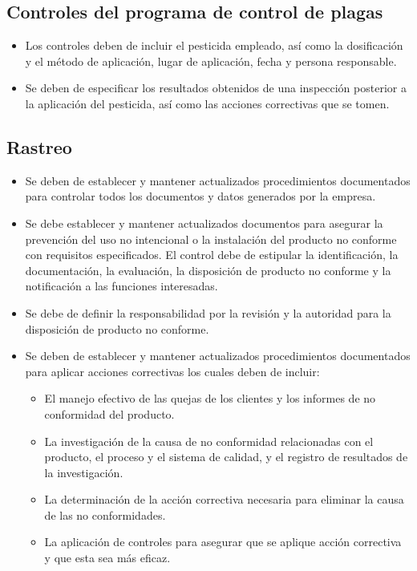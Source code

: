 \subsection{Controles del programa de control de plagas}
\begin{itemize}
	\item Los controles deben de incluir el pesticida empleado, así como la dosificación y el método de aplicación, lugar de aplicación, fecha y persona responsable.
	\item Se deben de especificar los resultados obtenidos de una inspección posterior a la aplicación del pesticida, así como las acciones correctivas que se tomen.
\end{itemize}

\subsection{Rastreo}
\begin{itemize}
	\item Se deben de establecer y mantener actualizados procedimientos documentados para controlar todos los documentos y datos generados por la empresa.
	\item Se debe establecer y mantener actualizados documentos para asegurar la prevención del uso no intencional o la instalación del producto no conforme con requisitos especificados. El control debe de estipular la identificación, la documentación, la evaluación, la disposición de producto no conforme y la notificación a las funciones interesadas.
	\item Se debe de definir la responsabilidad por la revisión y la autoridad para la disposición de producto no conforme.
	\item Se deben de establecer y mantener actualizados procedimientos documentados para aplicar acciones correctivas los cuales deben de incluir:
	      \begin{itemize}
		      \item El manejo efectivo de las quejas de los clientes y los informes de no conformidad del producto.
		      \item La investigación de la causa de no conformidad relacionadas con el producto, el proceso y el sistema de calidad, y el registro de resultados de la investigación.
		      \item La determinación de la acción correctiva necesaria para eliminar la causa de las no conformidades.
		      \item La aplicación de controles para asegurar que se aplique acción correctiva y que esta sea más eficaz.
	      \end{itemize}
\end{itemize}

